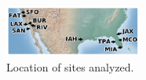 \documentclass[10pt,a4paper,twocolumn]{article}
\begin{document}
% 
% 

\begin{figure}[ht!]
\centering
\includegraphics[width=0.4\textwidth]{figs/sitemap.pdf}
\caption{\label{fig:sitemap}Location of sites analyzed.}
\end{figure}
\end{document}
